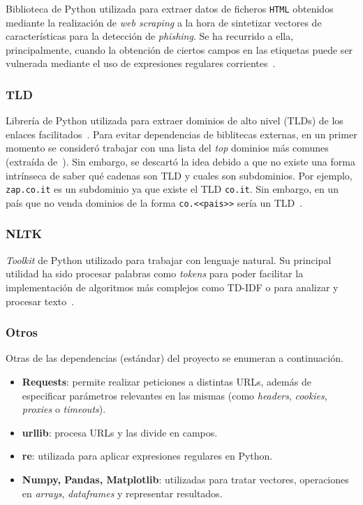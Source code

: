 Biblioteca de Python utilizada para extraer datos de ficheros \texttt{HTML} obtenidos mediante la realización de \textit{web scraping} a la hora de sintetizar vectores de características para la detección de \textit{phishing}. Se ha recurrido a ella, principalmente, cuando la obtención de ciertos campos en las etiquetas puede ser vulnerada mediante el uso de expresiones regulares corrientes~\cite{bs4Docs}.

\subsubsection{TLD}

Librería de Python utilizada para extraer dominios de alto nivel (TLDs) de los enlaces facilitados~\cite{tldLibreria}. Para evitar dependencias de biblitecas externas, en un primer momento se consideró trabajar con una lista del \textit{top} dominios más comunes (extraída de~\cite{tldLista}). Sin embargo, se descartó la idea debido a que no existe una forma intrínseca de saber qué cadenas son TLD y cuales son subdominios. Por ejemplo, \texttt{zap.co.it} es un subdominio ya que existe el TLD \texttt{co.it}. Sin embargo, en un país que no venda dominios de la forma \texttt{co.<<pais>>} sería un TLD~\cite{tldNogenerico}.

\subsubsection{NLTK}

\textit{Toolkit} de Python utilizado para trabajar con lenguaje natural. Su principal utilidad ha sido procesar palabras como \textit{tokens} para poder facilitar la implementación de algoritmos más complejos como TD-IDF o para analizar y procesar texto~\cite{nltk}.

\subsubsection{Otros}

Otras de las dependencias (estándar) del proyecto se enumeran a continuación.

\begin{itemize}
	\item \textbf{Requests}: permite realizar peticiones a distintas URLs, además de especificar parámetros relevantes en las mismas (como \textit{headers}, \textit{cookies}, \textit{proxies} o \textit{timeouts}).
	\item \textbf{urllib}: procesa URLs y las divide en campos.
	\item \textbf{re}: utilizada para aplicar expresiones regulares en Python.
	\item \textbf{Numpy, Pandas, Matplotlib}: utilizadas para tratar vectores, operaciones en \textit{arrays}, \textit{dataframes} y representar resultados.
\end{itemize}


